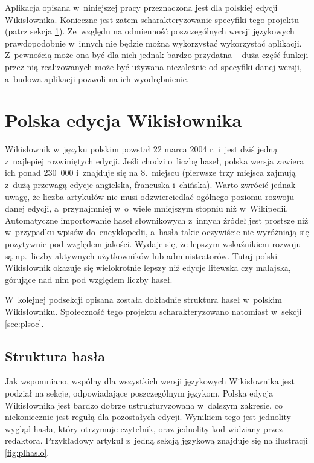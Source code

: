 \documentclass{pracamgr}
\begin{document}
Aplikacja opisana w~niniejszej pracy przeznaczona jest dla polskiej edycji Wikisłownika. Konieczne jest zatem scharakteryzowanie specyfiki tego projektu (patrz sekcja \ref{sec:plwikt}). Ze~względu na odmienność poszczególnych wersji językowych prawdopodobnie w~innych nie będzie można wykorzystać wykorzystać aplikacji. Z~pewnością może ona być dla nich jednak bardzo przydatna -- duża część funkcji przez nią realizowanych może być używana niezależnie od specyfiki danej wersji, a~budowa aplikacji pozwoli na ich wyodrębnienie.

\section{Polska edycja Wikisłownika}
\label{sec:plwikt}
Wikisłownik w~języku polskim powstał 22 marca 2004 r. %
i~jest dziś jedną z~najlepiej rozwiniętych edycji. Jeśli chodzi o~liczbę haseł, polska wersja zawiera ich ponad 230~000 i~znajduje się na 8.~miejscu (pierwsze trzy miejsca zajmują z~dużą przewagą edycje angielska, francuska i~chińska). Warto zwrócić jednak uwagę, że liczba artykułów nie musi odzwierciedlać ogólnego poziomu rozwoju danej edycji, a~przynajmniej w~o~wiele mniejszym stopniu niż w~Wikipedii. Automatyczne importowanie haseł słownikowych z~innych źródeł jest prostsze niż w~przypadku wpisów do~encyklopedii, a~hasła takie oczywiście nie wyróżniają się pozytywnie pod względem jakości. Wydaje się, że lepszym wskaźnikiem rozwoju są np.\ liczby aktywnych użytkowników lub administratorów. Tutaj polski Wikisłownik okazuje się wielokrotnie lepszy niż edycje litewska czy malajska, górujące nad nim pod względem liczby haseł.

W~kolejnej podsekcji opisana została dokładnie struktura haseł w~polskim Wikisłowniku. Społeczność tego projektu scharakteryzowano natomiast w~sekcji \ref{sec:plsoc}.

\subsection{Struktura hasła}
Jak wspomniano, wspólny dla wszystkich wersji językowych Wikisłownika jest podział na sekcje, odpowiadające poszczególnym językom. Polska edycja Wikisłownika jest bardzo dobrze ustrukturyzowana w~dalszym zakresie, co niekoniecznie jest regułą dla pozostałych edycji. Wynikiem tego jest jednolity wygląd hasła, który otrzymuje czytelnik, oraz jednolity kod widziany przez redaktora. Przykładowy artykuł z~jedną sekcją językową znajduje się na ilustracji \ref{fig:plhaslo}.
\end{document}
